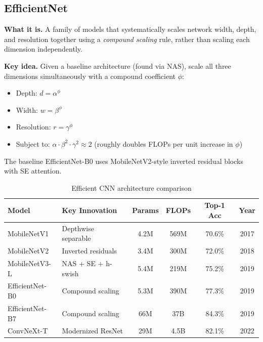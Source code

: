 \subsection{EfficientNet}

\textbf{What it is.} A family of models that systematically scales network width, depth, and resolution together using a \textit{compound scaling} rule, rather than scaling each dimension independently.

\textbf{Key idea.} Given a baseline architecture (found via NAS), scale all three dimensions simultaneously with a compound coefficient $\phi$:
\begin{itemize}
    \item Depth: $d = \alpha^\phi$
    \item Width: $w = \beta^\phi$
    \item Resolution: $r = \gamma^\phi$
    \item Subject to: $\alpha \cdot \beta^2 \cdot \gamma^2 \approx 2$ (roughly doubles FLOPs per unit increase in $\phi$)
\end{itemize}

The baseline EfficientNet-B0 uses MobileNetV2-style inverted residual blocks with SE attention.

\begin{table}[H]
\centering
\caption{Efficient CNN architecture comparison}
\begin{tabularx}{\textwidth}{lXcccc}
\toprule
\textbf{Model} & \textbf{Key Innovation} & \textbf{Params} & \textbf{FLOPs} & \textbf{Top-1 Acc} & \textbf{Year} \\
\midrule
MobileNetV1 & Depthwise separable & 4.2M & 569M & 70.6\% & 2017 \\
MobileNetV2 & Inverted residuals & 3.4M & 300M & 72.0\% & 2018 \\
MobileNetV3-L & NAS + SE + h-swish & 5.4M & 219M & 75.2\% & 2019 \\
EfficientNet-B0 & Compound scaling & 5.3M & 390M & 77.3\% & 2019 \\
EfficientNet-B7 & Compound scaling & 66M & 37B & 84.3\% & 2019 \\
ConvNeXt-T & Modernized ResNet & 29M & 4.5B & 82.1\% & 2022 \\
\bottomrule
\end{tabularx}
\end{table}

